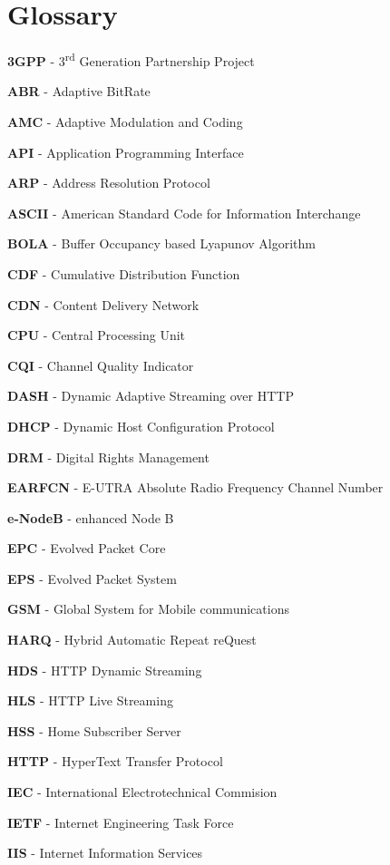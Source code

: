 \cleardoublepage
{}
\chapter*{Glossary}


\textbf{3GPP} - 3\textsuperscript{rd} Generation Partnership Project

\textbf{ABR} - Adaptive BitRate

\textbf{AMC} - Adaptive Modulation and Coding

\textbf{API} - Application Programming Interface

\textbf{ARP} - Address Resolution Protocol

\textbf{ASCII} - American Standard Code for Information Interchange

\textbf{BOLA} - Buffer Occupancy based Lyapunov Algorithm

\textbf{CDF} - Cumulative Distribution Function

\textbf{CDN} - Content Delivery Network

\textbf{CPU} - Central Processing Unit

\textbf{CQI} - Channel Quality Indicator

\textbf{DASH} - Dynamic Adaptive Streaming over HTTP

\textbf{DHCP} - Dynamic Host Configuration Protocol

\textbf{DRM} - Digital Rights Management

\textbf{EARFCN} - E-UTRA Absolute Radio Frequency Channel Number

\textbf{e-NodeB} - enhanced Node B

\textbf{EPC} - Evolved Packet Core

\textbf{EPS} - Evolved Packet System

\textbf{GSM} - Global System for Mobile communications

\textbf{HARQ} - Hybrid Automatic Repeat reQuest

\textbf{HDS} - HTTP Dynamic Streaming

\textbf{HLS} - HTTP Live Streaming

\textbf{HSS} - Home Subscriber Server

\textbf{HTTP} - HyperText Transfer Protocol

\textbf{IEC} - International Electrotechnical Commision

\textbf{IETF} - Internet Engineering Task Force

\textbf{IIS} - Internet Information Services

